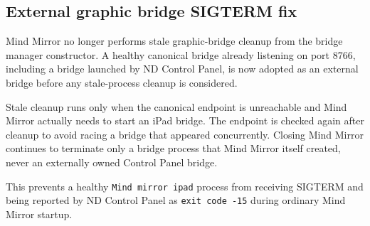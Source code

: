 \documentclass[a4paper]{article}
\title{}
\date{}
\author{Mohammad Rahmani}
\begin{document}
   \maketitle

   \begin{preview}
      \section*{External graphic bridge SIGTERM fix}

      Mind Mirror no longer performs stale graphic-bridge cleanup from the bridge manager constructor. A healthy canonical bridge already listening on port 8766, including a bridge launched by ND Control Panel, is now adopted as an external bridge before any stale-process cleanup is considered.

      Stale cleanup runs only when the canonical endpoint is unreachable and Mind Mirror actually needs to start an iPad bridge. The endpoint is checked again after cleanup to avoid racing a bridge that appeared concurrently. Closing Mind Mirror continues to terminate only a bridge process that Mind Mirror itself created, never an externally owned Control Panel bridge.

      This prevents a healthy \texttt{Mind mirror ipad} process from receiving SIGTERM and being reported by ND Control Panel as \texttt{exit code -15} during ordinary Mind Mirror startup.
   \end{preview}

   
   
\end{document}

